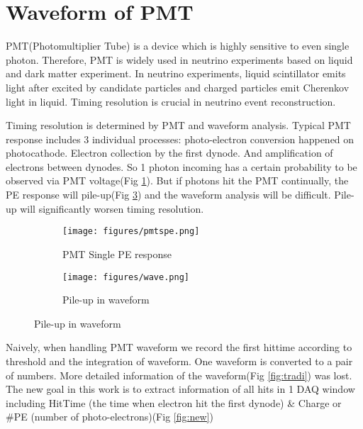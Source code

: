 \section{Waveform of PMT} %
PMT(Photomultiplier Tube) is a device which is highly sensitive to even single photon. Therefore, PMT is widely used in neutrino experiments based on liquid and dark matter experiment. In neutrino experiments, liquid scintillator emits light after excited by candidate particles and charged particles emit Cherenkov light in liquid. Timing resolution is crucial in neutrino event reconstruction. 

Timing resolution is determined by PMT and waveform analysis. Typical PMT response includes 3 individual processes: photo-electron conversion happened on photocathode. Electron collection by the first dynode. And amplification of electrons between dynodes. So 1 photon incoming has a certain probability to be observed via PMT voltage(Fig \ref{fig:spe}). But if photons hit the PMT continually, the PE response will pile-up(Fig \ref{fig:pile}) and the waveform analysis will be difficult. Pile-up will significantly worsen timing resolution. 

\begin{figure}[H]
\begin{minipage}{.5\textwidth}
\begin{figure}[H]
    \centering
    \caption{PMT Single PE response}
    \texttt{[image: figures/pmtspe.png]}
    \label{fig:spe}
\end{figure}
\end{minipage}
\begin{minipage}{.5\textwidth}
\begin{figure}[H]
    \centering
    \caption{Pile-up in waveform}
    \texttt{[image: figures/wave.png]}
    \label{fig:pile}
\end{figure}
\end{minipage}
\end{figure}

Naively, when handling PMT waveform we record the first hittime according to threshold and the integration of waveform. One waveform is converted to a pair of numbers. More detailed information of the waveform(Fig \ref{fig:tradi}) was lost. The new goal in this work is to extract information of all hits in 1 DAQ window including HitTime (the time when electron hit the first dynode) \& Charge or \#PE (number of photo-electrons)(Fig \ref{fig:new})


